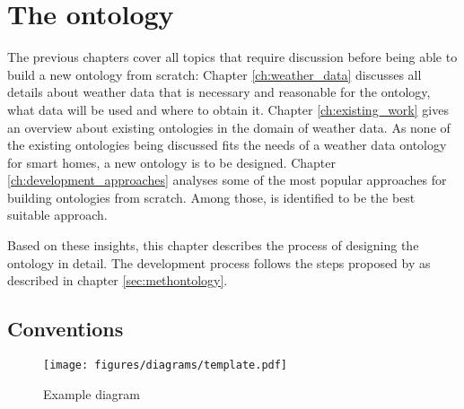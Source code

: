 \chapter{The \smarthomeweather ontology}
\label{ch:smarthomeweather_ontology}





The previous chapters cover all topics that require discussion before being able to build a new ontology from scratch: Chapter \ref{ch:weather_data} discusses all details about weather data that is necessary and reasonable for the \smarthomeweather ontology, what data will be used and where to obtain it. Chapter \ref{ch:existing_work} gives an overview about existing ontologies in the domain of weather data. As none of the existing ontologies being discussed fits the needs of a weather data ontology for smart homes, a new ontology is to be designed. Chapter \ref{ch:development_approaches} analyses some of the most popular approaches for building ontologies from scratch. Among those, \methontology \cite{Methontology} is identified to be the best suitable approach.

Based on these insights, this chapter describes the process of designing the \smarthomeweather ontology in detail. The development process follows the steps proposed by \methontology as described in chapter \ref{sec:methontology}.

\section{Conventions}
\label{sec:ontology_conventions}

\begin{figure}
  \texttt{[image: figures/diagrams/template.pdf]}
  \caption{Example diagram}
  \label{fig:diagram_example}
\end{figure}


